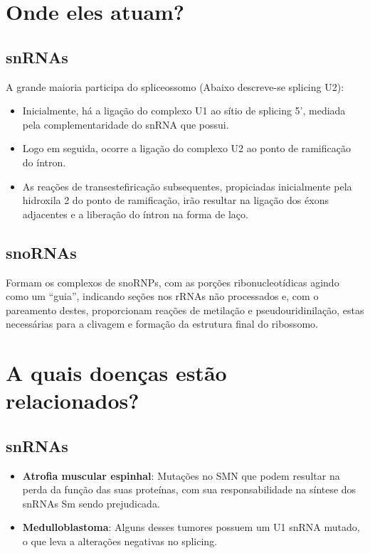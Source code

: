 \documentclass[
]{book}
\begin{document}
\hypertarget{onde-eles-atuam}{%
\section{Onde eles atuam?}\label{onde-eles-atuam}}

\hypertarget{snrnas-1}{%
\subsection{snRNAs}\label{snrnas-1}}

A grande maioria participa do spliceossomo (Abaixo descreve-se splicing U2):

\begin{itemize}
\item
  Inicialmente, há a ligação do complexo U1 ao sítio de splicing 5', mediada pela complementaridade do snRNA que possui.
\item
  Logo em seguida, ocorre a ligação do complexo U2 ao ponto de ramificação do íntron.
\item
  As reações de transestefiricação subsequentes, propiciadas inicialmente pela hidroxila 2 do ponto de ramificação, irão resultar na ligação dos éxons adjacentes e a liberação do íntron na forma de laço.
\end{itemize}

\hypertarget{snornas-1}{%
\subsection{snoRNAs}\label{snornas-1}}

Formam os complexos de snoRNPs, com as porções ribonucleotídicas agindo como um ``guia'', indicando seções nos rRNAs não processados e, com o pareamento destes, proporcionam reações de metilação e pseudouridinilação, estas necessárias para a clivagem e formação da estrutura final do ribossomo.

\hypertarget{a-quais-doenuxe7as-estuxe3o-relacionados}{%
\section{A quais doenças estão relacionados?}\label{a-quais-doenuxe7as-estuxe3o-relacionados}}

\hypertarget{snrnas-2}{%
\subsection{snRNAs}\label{snrnas-2}}

\begin{itemize}
\item
  \textbf{Atrofia muscular espinhal}: Mutações no SMN que podem resultar na perda da função das suas proteínas, com sua responsabilidade na síntese dos snRNAs Sm sendo prejudicada.
\item
  \textbf{Medulloblastoma}: Alguns desses tumores possuem um U1 snRNA mutado, o que leva a alterações negativas no splicing.
\end{itemize}
\end{document}
